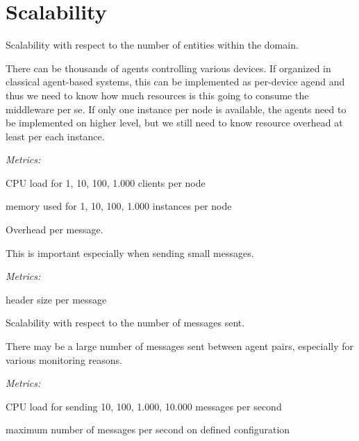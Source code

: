 \documentclass[a4paper]{report}
\newenvironment{metrics}{\par\emph{Metrics:}\begin{compactitem}}{\end{compactitem}}
\begin{document}
\section{Scalability}

\begin{itemize}

\item Scalability with respect to the number of entities within the domain.

There can be thousands of agents controlling various devices. If organized in
classical agent-based systems, this can be implemented as per-device agend and
thus we need to know how much resources is this going to consume the middleware
per se. If only one instance per node is available, the agents need to be
implemented on higher level, but we still need to know resource overhead at
least per each instance.

\begin{metrics}

\item CPU load for 1, 10, 100, 1.000 clients per node

\item memory used for 1, 10, 100, 1.000 instances per node

\end{metrics}


\item Overhead per message.

This is important especially when sending small messages.

\begin{metrics}

\item header size per message

\end{metrics}



\item Scalability with respect to the number of messages sent.

There may be a large number of messages sent between agent pairs, especially
for various monitoring reasons.

\begin{metrics}

\item CPU load for sending 10, 100, 1.000, 10.000 messages per second

\item maximum number of messages per second on defined configuration

\end{metrics}

\end{itemize}
\end{document}
